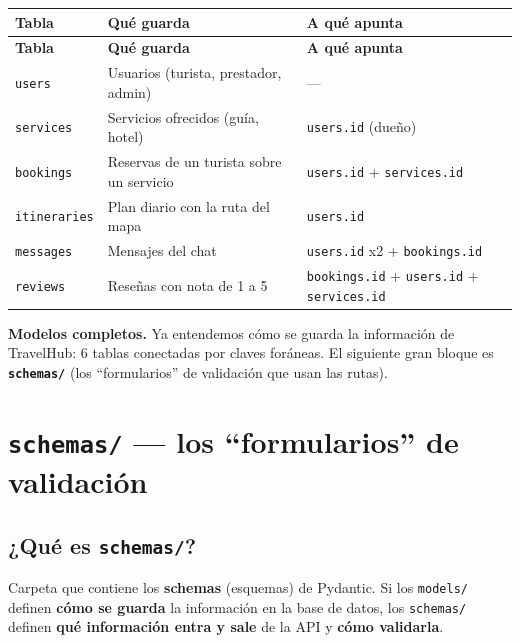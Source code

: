 \documentclass[11pt,a4paper]{article}
\begin{document}
\begin{center}
{\small
\setlength{\tabcolsep}{4pt}
\begin{longtable}{@{}>{\raggedright\arraybackslash}p{3.2cm}>{\raggedright\arraybackslash}p{5.4cm}>{\raggedright\arraybackslash}p{6.3cm}@{}}
\toprule
\textbf{Tabla} & \textbf{Qué guarda} & \textbf{A qué apunta} \\
\midrule
\endfirsthead
\toprule
\textbf{Tabla} & \textbf{Qué guarda} & \textbf{A qué apunta} \\
\midrule
\endhead
\texttt{users} & Usuarios (turista, prestador, admin) & --- \\
\texttt{services} & Servicios ofrecidos (guía, hotel) & \texttt{users.id} (dueño) \\
\texttt{bookings} & Reservas de un turista sobre un servicio & \texttt{users.id} + \texttt{services.id} \\
\texttt{itineraries} & Plan diario con la ruta del mapa & \texttt{users.id} \\
\texttt{messages} & Mensajes del chat & \texttt{users.id} x2 + \texttt{bookings.id} \\
\texttt{reviews} & Reseñas con nota de 1 a 5 & \texttt{bookings.id} + \texttt{users.id} + \texttt{services.id} \\
\bottomrule
\end{longtable}
}
\end{center}

\begin{recuadro}
\textbf{Modelos completos.} Ya entendemos cómo se guarda la información de TravelHub:
6 tablas conectadas por claves foráneas. El siguiente gran bloque es
\textbf{\texttt{schemas/}} (los ``formularios'' de validación que usan las rutas).
\end{recuadro}

\section{\texttt{schemas/} --- los ``formularios'' de validación}

\subsection{¿Qué es \texttt{schemas/}?}

Carpeta que contiene los \textbf{schemas} (esquemas) de Pydantic. Si los \texttt{models/}
definen \textbf{cómo se guarda} la información en la base de datos, los \texttt{schemas/}
definen \textbf{qué información entra y sale} de la API y \textbf{cómo validarla}.
\end{document}
